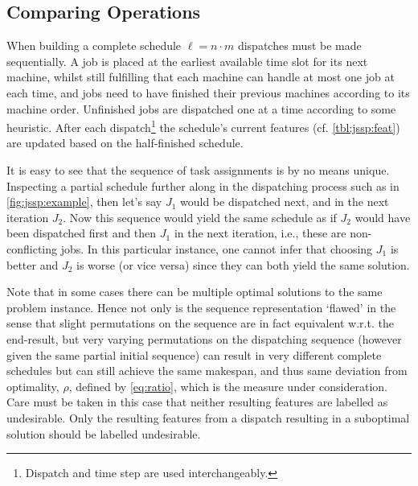 \documentclass[smallextended]{svjour3}
\begin{document}
\begin{table}\centering
  \caption[Problem space distributions used in experimental studies.]{Problem 
    space distributions used in experimental studies. Note, problem instances 
    are synthetic and each problem space is i.i.d. 
  }\label{tbl:data:sim}
  
\end{table} 


\subsection{Comparing Operations}\label{sec:compare}
When building a complete schedule $\ell=n\cdot m$ dispatches must be made 
sequentially.  A job is placed at the earliest available time slot for its next 
machine, whilst still fulfilling that each machine can handle at most one job 
at each time, and jobs need to have finished their previous machines according 
to its machine order. Unfinished jobs are dispatched one at a time according to 
some heuristic. After each dispatch\footnote{Dispatch and time step are used 
	interchangeably.} the schedule's current features (cf. \cref{tbl:jssp:feat}) 
are updated based on the half-finished schedule.

It is easy to see that the sequence of task assignments is by no means unique. 
Inspecting a partial schedule further along in the dispatching process such as 
in \cref{fig:jssp:example}, then let's say $J_1$ would be dispatched next, and 
in the next iteration $J_2$. Now this sequence would yield the same schedule as 
if $J_2$ would have been dispatched first and then $J_1$ in the next iteration, 
i.e., these are non-conflicting jobs.  In this particular instance, one cannot 
infer that choosing $J_1$ is better and $J_2$ is worse (or vice versa) since
they can both yield the same solution. 

Note that in some cases there can be multiple optimal solutions to the same 
problem instance. Hence not only is the sequence representation `flawed' in the 
sense that slight permutations on the sequence are in fact equivalent w.r.t. 
the end-result, but very varying permutations on the dispatching sequence 
(however given the same partial initial sequence) can result in very different 
complete schedules but can still achieve the same makespan, and thus same 
deviation from optimality, $\rho$, defined by \eqref{eq:ratio}, which is the 
measure under consideration. Care must be taken in this case that neither 
resulting features are labelled as undesirable. Only the resulting features 
from a dispatch resulting in a suboptimal solution should be labelled 
undesirable.
\end{document}
